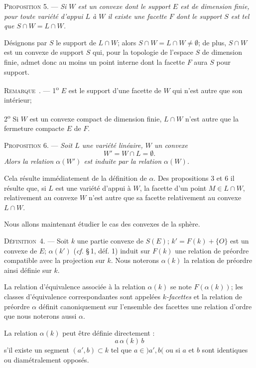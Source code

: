 \documentclass[11pt]{article}
\newcommand{\bzcf}[2]{#1}
\newcommand{\bznum}[1]{\if\relax\detokenize{#1}\relax\else\ #1\fi}
\newenvironment{defin}[1][]{\par\medskip\noindent\textsc{Définition\bznum{#1}.} --- }{\par\medskip}
\newenvironment{prop}[1][]{\par\medskip\noindent\textsc{Proposition #1.} --- \itshape}{\par\medskip}
\newenvironment{remarque}[1][]{\par\medskip\noindent\textsc{Remarque\bznum{#1}.} --- }{\par\medskip}
\newenvironment{proof}[1][]{\par}{\par}
\begin{document}
\begin{prop}[5]
Si $W$ est un convexe dont le support $E$ est de dimension finie, pour toute variété d'appui $L$ à
$W$ il existe une facette $F$ dont le support $S$ est tel que $S\cap W=L\cap W$.
\end{prop}

\begin{proof}
Désignons par $S$ le support de $L\cap W$; alors $S\cap W=L\cap W\neq\emptyset$; de plus,
$S\cap W$ est un convexe de support $S$ qui, pour la topologie de l'espace $S$ de dimension finie,
admet donc au moins un point interne dont la facette $F$ aura $S$ pour support.
\end{proof}

\begin{remarque}
1\textsuperscript{o} $E$ est le support d'une facette de $W$ qui n'est autre que son intérieur;

2\textsuperscript{o} Si $W$ est un convexe compact de dimension finie, $L\cap W$ n'est autre que
la fermeture compacte $E$ de $F$.
\end{remarque}

\begin{prop}[6]
Soit $L$ une variété linéaire, $W$ un convexe
\[ W'=W\cap L=\emptyset. \]
Alors la relation $\alpha(W')$ est induite par la relation $\alpha(W)$.
\end{prop}

\begin{proof}
Cela résulte immédiatement de la définition de $\alpha$. Des \bzcf{propositions
3}{\ref{bzprop:c3s1p3_ordre_supports}} et 6 il résulte que, si $L$ est une variété d'appui à $W$,
la facette d'un point $M\in L\cap W$, relativement au convexe $W$ n'est autre que sa facette
relativement au convexe $L\cap W$.
\end{proof}

Nous allons maintenant étudier le cas des convexes de la sphère.

\begin{defin}[4]
Soit $k$ une partie convexe de $S(E)$; $k'=F(k)+\{O\}$ est un convexe de $E$; $\alpha(k')$
(\bzcf{\textit{cf.} \S\,1, déf. 1}{\ref{bzdef:c3s1d1_preordre_alpha}}) induit sur $F(k)$ une
relation de préordre compatible avec la projection sur $k$. Nous noterons $\alpha(k)$ la relation
de préordre ainsi définie sur $k$.

La relation d'équivalence associée à la relation $\alpha(k)$ se note $F(\alpha(k))$; les classes
d'équivalence correspondantes sont appelées \textit{$k$-facettes} et la relation de préordre
$\alpha$ définit canoniquement sur l'ensemble des facettes une relation d'ordre que nous noterons
aussi $\alpha$.

La relation $\alpha(k)$ peut être définie directement :
\[ a\,\alpha(k)\,b \]
s'il existe un segment $(a', b)\subset k$ tel que $a\in)a', b($ ou si $a$ et $b$ sont
identiques ou diamétralement opposés.
\end{defin}
\end{document}
